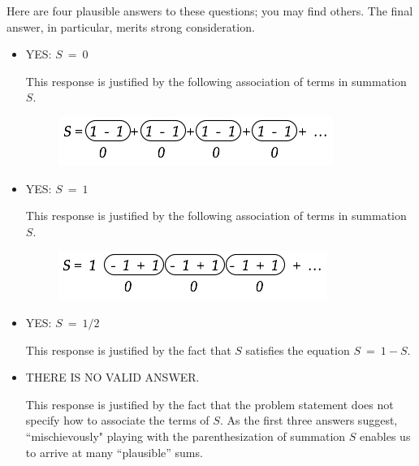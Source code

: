 \smallskip

\noindent
Here are four plausible answers to these questions; you may find others.  The final answer, in particular, merits strong consideration.
\begin{itemize}
\item
YES: $S \ = \ 0$

\smallskip

This response is justified by the following association of terms in summation $S$.
\begin{figure}[h]
\begin{center}
        \includegraphics[scale=0.45]{FiguresArithmetic/InfiniteParadox1}
\end{center}
\end{figure}

\medskip\item
YES: $S \ = \ 1$

\smallskip

This response is justified by the following association of terms in summation $S$.
\begin{figure}[h]
\begin{center}
        \includegraphics[scale=0.45]{FiguresArithmetic/InfiniteParadox2}
\end{center}
\end{figure}

\medskip\item
YES: $S \ = \ 1/2$
\smallskip

This response is justified by the fact that $S$ satisfies the equation $S \ = \ 1-S$.

\medskip\item
THERE IS NO VALID ANSWER.

\smallskip

This response is justified by the fact that the problem statement does not specify how to associate the terms of $S$.  As the first three answers suggest, ``mischievously" playing with the parenthesization of summation $S$ enables us to arrive at many ``plausible'' sums.
\end{itemize}


